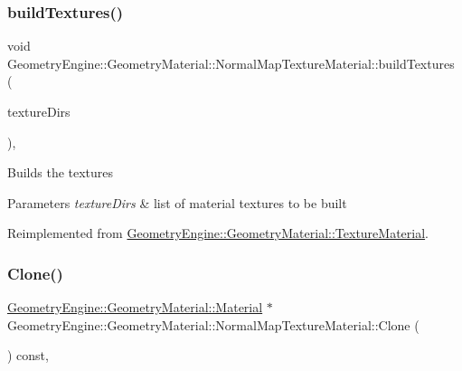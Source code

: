 \subsubsection{\texorpdfstring{buildTextures()}{buildTextures()}}
{\footnotesize\ttfamily void Geometry\+Engine\+::\+Geometry\+Material\+::\+Normal\+Map\+Texture\+Material\+::build\+Textures (\begin{DoxyParamCaption}\item[{const std\+::list$<$ \mbox{\hyperlink{class_geometry_engine_1_1_geometry_material_1_1_texture_parameters}{Texture\+Parameters}} $\ast$ $>$ \&}]{texture\+Dirs }\end{DoxyParamCaption})\hspace{0.3cm}{\ttfamily [protected]}, {\ttfamily [virtual]}}

Builds the textures 
\begin{DoxyParams}{Parameters}
{\em texture\+Dirs} & list of material textures to be built \\
\hline
\end{DoxyParams}


Reimplemented from \mbox{\hyperlink{class_geometry_engine_1_1_geometry_material_1_1_texture_material_a39212e653a556734e261ef610ab0ad9f}{Geometry\+Engine\+::\+Geometry\+Material\+::\+Texture\+Material}}.

\mbox{\label{class_geometry_engine_1_1_geometry_material_1_1_normal_map_texture_material_a3a3d1f16cf175f084bc3eeab56f6e42f}} 
\subsubsection{\texorpdfstring{Clone()}{Clone()}}
{\footnotesize\ttfamily \mbox{\hyperlink{class_geometry_engine_1_1_geometry_material_1_1_material}{Geometry\+Engine\+::\+Geometry\+Material\+::\+Material}} $\ast$ Geometry\+Engine\+::\+Geometry\+Material\+::\+Normal\+Map\+Texture\+Material\+::\+Clone (\begin{DoxyParamCaption}{ }\end{DoxyParamCaption}) const\hspace{0.3cm}{\ttfamily [override]}, {\ttfamily [virtual]}}

